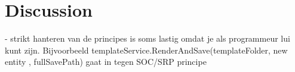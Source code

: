 \chapter{Discussion} \label{chap_discussion}

- strikt hanteren van de principes is soms lastig omdat je als programmeur lui kunt zijn.
Bijvoorbeeld templateService.RenderAndSave(templateFolder, new { entity }, fullSavePath)
gaat in tegen SOC/SRP principe